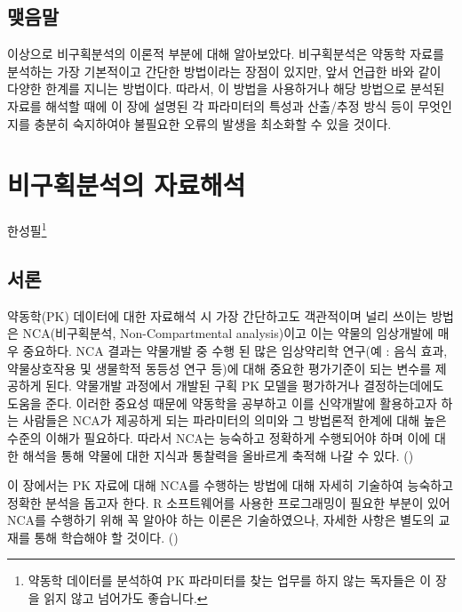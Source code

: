\documentclass[
  11pt,
  krantz2, a4paper, twoside]{krantz}
\theoremstyle{definition}
\theoremstyle{definition}
\theoremstyle{definition}
\theoremstyle{definition}
\theoremstyle{remark}
\begin{document}
\section{맺음말}\label{uxb9fauxc74cuxb9d0-1}

이상으로 비구획분석의 이론적 부분에 대해 알아보았다.
비구획분석은 약동학 자료를 분석하는 가장 기본적이고 간단한 방법이라는 장점이 있지만, 앞서 언급한 바와 같이 다양한 한계를 지니는 방법이다. 
따라서, 이 방법을 사용하거나 해당 방법으로 분석된 자료를 해석할 때에 이 장에 설명된 각 파라미터의 특성과 산출/추정 방식 등이 무엇인지를 충분히 숙지하여야 불필요한 오류의 발생을 최소화할 수 있을 것이다.

\chapter{비구획분석의 자료해석}\label{nca-analysis}

\Large\hfill

한성필\footnote{약동학 데이터를 분석하여 PK 파라미터를 찾는 업무를 하지 않는 독자들은 이 장을 읽지 않고 넘어가도 좋습니다.}
\normalsize

\section{서론}\label{uxc11cuxb860-2}

약동학(PK) 데이터에 대한 자료해석 시 가장 간단하고도 객관적이며 널리 쓰이는 방법은 NCA(비구획분석, Non-Compartmental analysis)이고 이는 약물의 임상개발에 매우 중요하다.
NCA 결과는 약물개발 중 수행 된 많은 임상약리학 연구(예 : 음식 효과, 약물상호작용 및 생물학적 동등성 연구 등)에 대해 중요한 평가기준이 되는 변수를 제공하게 된다.
약물개발 과정에서 개발된 구획 PK 모델을 평가하거나 결정하는데에도 도움을 준다.
이러한 중요성 때문에 약동학을 공부하고 이를 신약개발에 활용하고자 하는 사람들은 NCA가 제공하게 되는 파라미터의 의미와 그 방법론적 한계에 대해 높은 수준의 이해가 필요하다. 
따라서 NCA는 능숙하고 정확하게 수행되어야 하며 이에 대한 해석을 통해 약물에 대한 지식과 통찰력을 올바르게 축적해 나갈 수 있다. ()

이 장에서는 PK 자료에 대해 NCA를 수행하는 방법에 대해 자세히 기술하여 능숙하고 정확한 분석을 돕고자 한다. R 소프트웨어를 사용한 프로그래밍이 필요한 부분이 있어 NCA를 수행하기 위해 꼭 알아야 하는 이론은 기술하였으나, 자세한 사항은 별도의 교재를 통해 학습해야 할 것이다. ()
\end{document}
